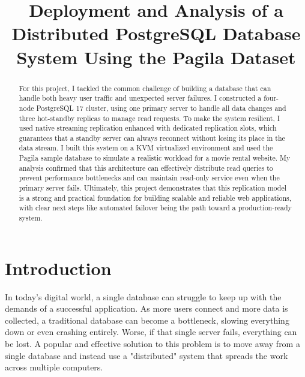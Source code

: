 \documentclass[conference]{IEEEtran}
\begin{document}
\title{Deployment and Analysis of a Distributed PostgreSQL Database System Using the Pagila Dataset}

\author{
}
\date{}

\maketitle

\begin{abstract}
For this project, I tackled the common challenge of building a database that can handle both heavy user traffic and unexpected server failures. I constructed a four-node PostgreSQL 17 cluster, using one primary server to handle all data changes and three hot-standby replicas to manage read requests. To make the system resilient, I used native streaming replication enhanced with dedicated replication slots, which guarantees that a standby server can always reconnect without losing its place in the data stream. I built this system on a KVM virtualized environment and used the Pagila sample database to simulate a realistic workload for a movie rental website. My analysis confirmed that this architecture can effectively distribute read queries to prevent performance bottlenecks and can maintain read-only service even when the primary server fails. Ultimately, this project demonstrates that this replication model is a strong and practical foundation for building scalable and reliable web applications, with clear next steps like automated failover being the path toward a production-ready system.
\end{abstract}





\section{Introduction}

In today's digital world, a single database can struggle to keep up with the demands of a successful application. As more users connect and more data is collected, a traditional database can become a bottleneck, slowing everything down or even crashing entirely. Worse, if that single server fails, everything can be lost. A popular and effective solution to this problem is to move away from a single database and instead use a "distributed" system that spreads the work across multiple computers.
\end{document}
